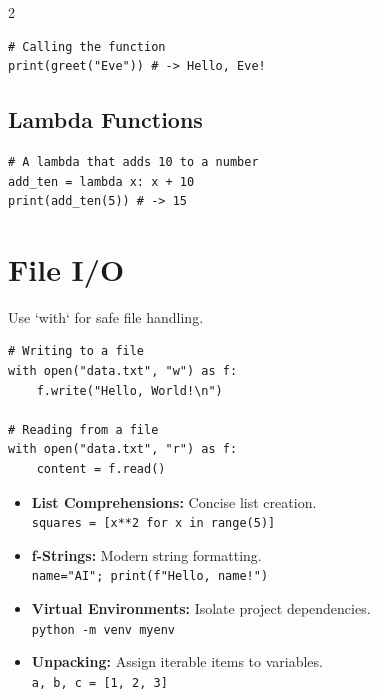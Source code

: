 \documentclass[10pt, a4paper]{article}
\begin{document}
\begin{multicols}{2}
\begin{lstlisting}
# Calling the function
print(greet("Eve")) # -> Hello, Eve!
\end{lstlisting}

\subsection*{Lambda Functions}
\begin{lstlisting}
# A lambda that adds 10 to a number
add_ten = lambda x: x + 10
print(add_ten(5)) # -> 15
\end{lstlisting}

\section*{File I/O \faFileAlt}
Use `with` for safe file handling.
\begin{lstlisting}
# Writing to a file
with open("data.txt", "w") as f:
    f.write("Hello, World!\n")

# Reading from a file
with open("data.txt", "r") as f:
    content = f.read()
\end{lstlisting}

\begin{tcolorbox}[
    colback=tipboxcolor, colframe=blue!50!black,
    title=\bfseries\faLightbulb~Pythonic Tips,
    fonttitle=\bfseries, arc=2mm, boxrule=1pt, top=2pt, bottom=2pt
]
\begin{itemize}
    \item \textbf{List Comprehensions:} Concise list creation. \\
    \texttt{squares = [x**2 for x in range(5)]}
    \item \textbf{f-Strings:} Modern string formatting. \\
    \texttt{name="AI"; print(f"Hello, {name}!")}
    \item \textbf{Virtual Environments:} Isolate project dependencies. \\
    \texttt{python -m venv myenv}
    \item \textbf{Unpacking:} Assign iterable items to variables. \\
    \texttt{a, b, c = [1, 2, 3]}
\end{itemize}
\end{tcolorbox}

\end{multicols} %
\end{document}
